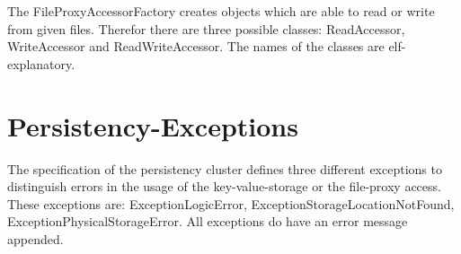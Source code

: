 The FileProxyAccessorFactory creates objects which are able to read or write
from given files. Therefor there are three possible classes: ReadAccessor,
WriteAccessor and ReadWriteAccessor. The names of the classes are
elf-explanatory.

\section{Persistency-Exceptions}
\label{sec:Persistency-Exceptions}

The specification of the persistency cluster defines three different exceptions
to distinguish errors in the usage of the key-value-storage or the file-proxy
access. These exceptions are: ExceptionLogicError,
ExceptionStorageLocationNotFound, ExceptionPhysicalStorageError. All exceptions
do have an error message appended.